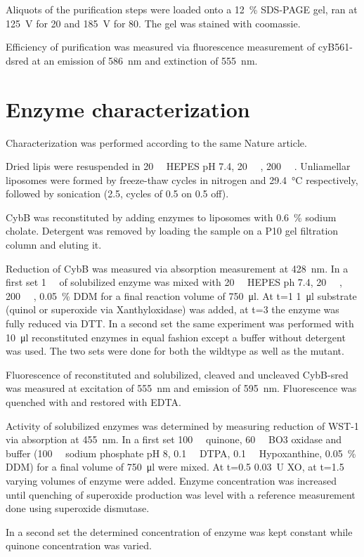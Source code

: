 Aliquots of the purification steps were loaded onto a \SI{12}{\percent}
SDS-PAGE gel, ran at \SI{125}{\V} for \SI{20}{\min} and \SI{185}{\V} for
\SI{80}{\min}. The gel was stained with coomassie.

Efficiency of purification was measured via fluorescence measurement of
cyB561-dsred at an emission of \SI{586}{\nm} and extinction of \SI{555}{\nm}.

\section{Enzyme characterization}

Characterization was performed according to the same Nature
article\cite{superoxide_salvaging}.

Dried lipis were resuspended in \SI{20}{\milli\Molar} HEPES pH 7.4,
\SI{20}{\milli\Molar} , \SI{200}{\milli\Molar} . Unliamellar
liposomes were formed by freeze-thaw cycles in nitrogen and \SI{29.4}{\celsius}
respectively, followed by sonication (\SI{2.5}{\min}, cycles of \SI{0.5}{\min}
on \SI{0.5}{\min} off).

CybB was reconstituted by adding enzymes to liposomes with \SI{0.6}{\percent}
sodium cholate. Detergent was removed by loading the sample on a P10 gel
filtration column and eluting it.

Reduction of CybB was measured via absorption measurement at \SI{428}{\nm}. In
a first set \SI{1}{\micro\Molar} of solubilized enzyme was mixed with
\SI{20}{\milli\Molar} HEPES ph 7.4, \SI{20}{\milli\Molar} ,
\SI{200}{\milli\Molar} , \SI{0.05}{\percent} DDM for a final reaction
volume of \SI{750}{\ul}. At t=\SI{1}{\min} \SI{1}{\ul} substrate (quinol or
superoxide via Xanthyloxidase) was added, at t=\SI{3}{\min} the enzyme was
fully reduced via DTT. In a second set the same experiment was performed with
\SI{10}{\ul} reconstituted enzymes in equal fashion except a buffer without
detergent was used. The two sets were done for both the wildtype as well as the
mutant.

Fluorescence of reconstituted and solubilized, cleaved and uncleaved CybB-sred
was measured at excitation of \SI{555}{\nm} and emission of \SI{595}{\nm}.
Fluorescence was quenched with  and restored with EDTA.

Activity of solubilized enzymes was determined by measuring reduction of WST-1
via absorption at \SI{455}{\nm}. In a first set \SI{100}{\micro\Molar} quinone,
\SI{60}{\nano\Molar} BO3 oxidase and buffer (\SI{100}{\milli\Molar} sodium
phosphate pH 8, \SI{0.1}{\milli\Molar} DTPA, \SI{0.1}{\milli\Molar}
Hypoxanthine, \SI{0.05}{\percent} DDM) for a final volume of \SI{750}{\ul} were
mixed. At t=\SI{0.5}{\min} \SI{0.03}{U} XO, at t=\SI{1.5}{\min} varying volumes
of enzyme were added. Enzyme concentration was increased until quenching of
superoxide production was level with a reference measurement done using
superoxide dismutase.

In a second set the determined concentration of enzyme was kept constant while
quinone concentration was varied.

\normalsize
